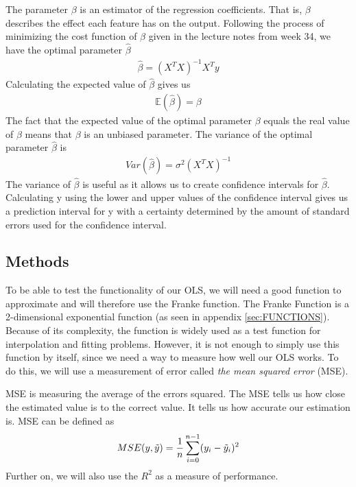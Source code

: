 \documentclass[english,notitlepage,reprint,nofootinbib]{revtex4-1}  %
\begin{document}
The parameter $\beta$ is an estimator of the regression coefficients. That is, $\beta$ describes the effect each feature has on the output. Following the process of minimizing the cost function of $\beta$ given in the lecture notes from week 34, we have the optimal parameter $\hat{\beta}$
\begin{align}
    \hat{\beta} = (X^TX)^{-1}X^Ty
\end{align}
Calculating the expected value of $\hat{\beta}$ gives us
\begin{align}
    \mathbb{E}(\hat{\beta}) = \beta
\end{align}
The fact that the expected value of the optimal parameter $\beta$ equals the real value of $\beta$ means that $\beta$ is an unbiased parameter. %
The variance of the optimal parameter $\hat{\beta}$ is 
\begin{align}
    Var(\hat{\beta}) = \sigma^2(X^TX)^{-1}
\end{align}
The variance of $\hat{\beta}$ is useful as it allows us to create confidence intervals for $\hat{\beta}$. Calculating y using the lower and upper values of the confidence interval gives us a prediction interval for y with a certainty determined by the amount of standard errors used for the confidence interval. 

\subsection{Methods}\label{subsec: METHODS}
To be able to test the functionality of our OLS, we will need a good function to approximate and will therefore use the Franke function.
The Franke Function is a 2-dimensional exponential function (as seen in appendix \ref{sec:FUNCTIONS}). Because of its complexity, the function is widely used as a test function for interpolation and fitting problems. However, it is not enough to simply use this function by itself, since we need a way to measure how well our OLS works. To do this, we will use a measurement of error called \textit{the mean squared error} (MSE).

MSE is measuring the average of the errors squared. The MSE tells us how close the estimated value is to the correct value. It tells us how accurate our estimation is. MSE can be defined as
\begin{align}
    MSE(y, \Tilde{y}) = \frac{1}{n} \sum_{i = 0}^{n - 1}(y_{i} - \Tilde{y}_{i})^2
\end{align}
Further on, we will also use the $R^2$ as a measure of performance.
\end{document}
